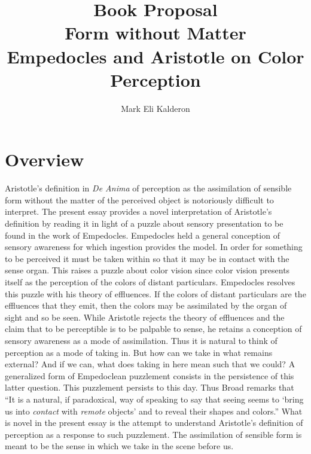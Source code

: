 \documentclass[12pt]{article}
\newcommand\myauthor{Mark Eli Kalderon}
\begin{document}
\author{\myauthor}
\title{Book Proposal\\
Form without Matter\\
Empedocles and Aristotle on Color Perception}
\date{}

\maketitle

\setlength{\parindent}{1em}


\section{Overview} %
\label{sec:overview}

Aristotle's definition in \emph{De Anima} of perception as the assimilation of sensible form without the matter of the perceived object is notoriously difficult to interpret. The present essay provides a novel interpretation of Aristotle's definition by reading it in light of a puzzle about sensory presentation to be found in the work of Empedocles. Empedocles held a general conception of sensory awareness for which ingestion provides the model. In order for something to be perceived it must be taken within so that it may be in contact with the sense organ. This raises a puzzle about color vision since color vision presents itself as the perception of the colors of distant particulars. Empedocles resolves this puzzle with his theory of effluences. If the colors of distant particulars are the effluences that they emit, then the colors may be assimilated by the organ of sight and so be seen. While Aristotle rejects the theory of effluences and the claim that to be perceptible is to be palpable to sense, he retains a conception of sensory awareness as a mode of assimilation. Thus it is natural to think of perception as a mode of taking in. But how can we take in what remains external? And if we can, what does taking in here mean such that we could? A generalized form of Empedoclean puzzlement consists in the persistence of this latter question. This puzzlement persists to this day. Thus Broad remarks that  ``It is a natural, if paradoxical, way of speaking to say that seeing seems to ‘bring us into \emph{contact} with \emph{remote} objects’ and to reveal their shapes and colors.'' What is novel in the present essay is the attempt to understand Aristotle's definition of perception as a response to such puzzlement. The assimilation of sensible form is meant to be the sense in which we take in the scene before us.
\end{document}

